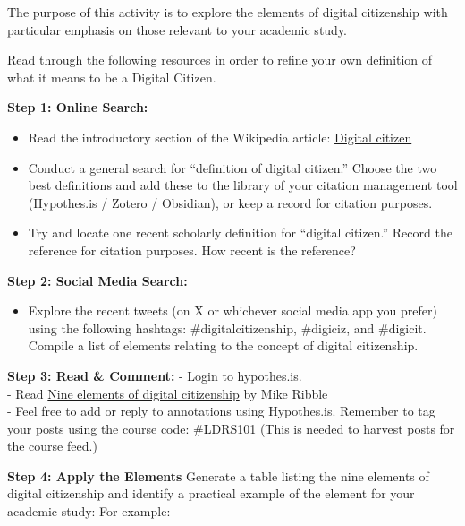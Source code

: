 \documentclass[
]{book}
\providecommand{\tightlist}{%
  \setlength{\itemsep}{0pt}\setlength{\parskip}{0pt}}
\theoremstyle{definition}
\theoremstyle{definition}
\theoremstyle{definition}
\theoremstyle{definition}
\theoremstyle{remark}
\begin{document}
\begin{reflect}
The purpose of this activity is to explore the elements of digital citizenship with particular emphasis on those relevant to your academic study.

Read through the following resources in order to refine your own definition of what it means to be a Digital Citizen.

\textbf{Step 1: Online Search:}

\begin{itemize}
\tightlist
\item
  Read the introductory section of the Wikipedia article: \href{https://en.wikipedia.org/wiki/Digital_citizen}{Digital citizen}\\
\item
  Conduct a general search for ``definition of digital citizen.'' Choose the two best definitions and add these to the library of your citation management tool (Hypothes.is / Zotero / Obsidian), or keep a record for citation purposes.\\
\item
  Try and locate one recent scholarly definition for ``digital citizen.'' Record the reference for citation purposes. How recent is the reference?
\end{itemize}

\textbf{Step 2: Social Media Search:}

\begin{itemize}
\tightlist
\item
  Explore the recent tweets (on X or whichever social media app you prefer) using the following hashtags: \#digitalcitizenship, \#digiciz, and \#digicit. Compile a list of elements relating to the concept of digital citizenship.
\end{itemize}

\textbf{Step 3: Read \& Comment:}
- Login to hypothes.is.\\
- Read \href{https://www.digitalcitizenship.net/nine-elements.html}{Nine elements of digital citizenship} by Mike Ribble\\
- Feel free to add or reply to annotations using Hypothes.is. Remember to tag your posts using the course code: \#LDRS101 (This is needed to harvest posts for the course feed.)

\textbf{Step 4: Apply the Elements}
Generate a table listing the nine elements of digital citizenship and identify a practical example of the element for your academic study: For example:


\end{reflect}
\end{document}

